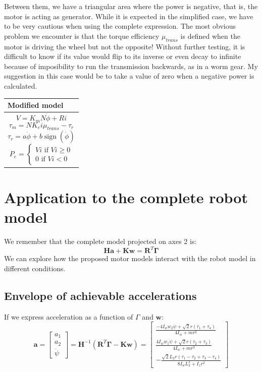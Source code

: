 \documentclass[12pt]{article}
\renewcommand{\vec}[1]{\bm{#1}}
\newcommand{\R}{\mathbb R}
\def\R{\vec R}
\begin{document}
Between them, we have a triangular area where the power is negative, that is, the motor is acting as generator. While it is expected in the simplified case, we have to be very cautious when using the complete expression. The most obvious problem we encounter is that the torque efficiency $\mu_{trans}$ is defined when the motor is driving the wheel but not the opposite! Without further testing, it is difficult to know if its value would flip to its inverse or even decay to infinite because of imposibility to run the transmission backwards, as in a worm gear. My suggestion in this case would be to take a value of zero when a negative power is calculated.
\begin{center}
	\begin{tabular}{ | m{14em} | } 
		\hline
		Modified model \\ 
		\hline
		$$ V = K_m N\dot{\phi} + Ri$$
		$$ \tau_m = N K_ei\mu_{trans} - \tau_r$$
		$$ \tau_r = a \dot{\phi} + b \operatorname{sign}(\dot{\phi}) $$
		$$ P_{e}=\begin{cases}
		Vi \text{  if  } Vi\geq 0\\
		0 \text{  if  } Vi < 0
		\end{cases}$$\\
		
		\hline
	\end{tabular}
\end{center}


\section*{Application to the complete robot model}

We remember that the complete model projected on axes 2 is:
$$\vec{H} \vec a+\vec K\vec w=\R^T\vec\Gamma$$
We can explore how the proposed motor models interact with the robot model in different conditions.

\subsection*{Envelope of achievable accelerations}
If we express acceleration as a function of $\Gamma$ and $\vec w$:
$$ \vec a = \left[\begin{matrix}a_{1}\\a_{2}\\\ddot{\psi}\end{matrix}\right] = \vec H^{-1}(\R^T \vec \Gamma - \vec K \vec w) =  \left[\begin{matrix}\frac{- 4 I_{w} w_{2} \dot{\psi} + \sqrt{2} r \left(\tau_{1} + \tau_{4}\right)}{4 I_{w} + m r^{2}}\\\frac{4 I_{w} w_{1} \dot{\psi} + \sqrt{2} r \left(\tau_{2} + \tau_{3}\right)}{4 I_{w} + m r^{2}}\\- \frac{\sqrt{2} L_{2} r \left(\tau_{1} - \tau_{2} + \tau_{3} - \tau_{4}\right)}{8 I_{w} L_{2}^{2} + I_{z} r^{2}}\end{matrix}\right]$$
\end{document}
